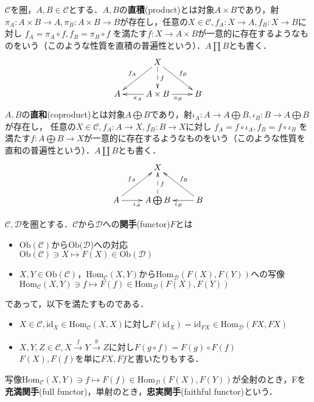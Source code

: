 \begin{defi}
$\mathcal{C}$を圏，$A,B\in \mathcal{C}$とする．$A,B$の{\bf 直積}(product)とは対象$A \times B$であり，射$\pi_A : A \times B \to A , 
\pi_B : A \times B \to B$が存在し，任意の$X \in \mathcal{C}, f_A : X \to A , f_B: X \to B$に対し $f_A = \pi_A \circ f , f_B = \pi_B \circ f$
を満たす$f : X\to A \times B$が一意的に存在するようなものをいう（このような性質を直積の普遍性という）．$A \prod B$とも書く．\\
\[
\xymatrix{
	& \ar[dl]_{f_A} X  \ar@{-->}[d]^{f}  \ar[dr]^{f_B}	& \\
A 	& \ar[l]^{\pi_A} A \times B \ar[r]_{\pi_B} 	& B 
}
\]
$A,B$の{\bf 直和}(coproduct)とは対象$A \bigoplus B$であり，射$\iota_A : A  \to A \bigoplus B, 
\iota_B : B \to  A \bigoplus B$が存在し，
任意の$X \in \mathcal{C}, f_A : A \to X , f_B: B \to X$に対し $f_A = f \circ \iota_A , f_B = f \circ \iota_B$
を満たす$f : A \bigoplus B \to X$が一意的に存在するようなものをいう（このような性質を直和の普遍性という）．$A \coprod B$とも書く．\\
\[
\xymatrix{
	& \ar@{<-}[dl]_{f_A} X  \ar@{<--}[d]^{f}  \ar@{<-}[dr]^{f_B}	& \\
A \ar[r]_{\iota_A}	&  A \bigoplus B  & \ar[l]^{\iota_B} B 
}
\] 
\end{defi} \proofend

\begin{defi}
$\mathcal{C,D}$を圏とする．$\mathcal{C}$から$\mathcal{D}$への{\bf 関手}(functor)$F$とは
\begin{itemize}
\item 
$\mathrm{Ob}(\mathcal{C})$から$\mathrm{Ob}(\mathcal{D}$)への対応\\
 $\mathrm{Ob}(\mathcal{C}) \ni X \mapsto F(X) \in \mathrm{Ob}(\mathcal{D})$
 
 \item 
$X,Y \in \mathrm{Ob}(\mathcal{C})$，$\mathrm{Hom}_\mathcal{C}(X,Y) $から$\mathrm{Hom}_\mathcal{D}(F(X),F(Y))$への写像\\
$\mathrm{Hom}_\mathcal{C}(X,Y) \ni f \mapsto F(f) \in \mathrm{Hom}_\mathcal{D}(F(X),F(Y))$
\end{itemize}
 であって，以下を満たすものである．
 
 \begin{itemize}
 \item
 $X \in \mathcal{C}, \mathrm{id}_X \in \mathrm{Hom}_\mathcal{C}(X,X)$に対し$F(\mathrm{id}_X) = \mathrm{id}_{FX} \in \mathrm{Hom}_\mathcal{D}(FX,FX)$
 \item
 $X,Y,Z \in \mathcal{C}, X \xrightarrow{f} Y \xrightarrow{g} Z$に対し$F(g \circ f) = F(g) \circ F(f)$ \\
 $F(X),F(f)$を単に$FX,Ff$と書いたりもする．
  
 \end{itemize}
 写像$\mathrm{Hom}_\mathcal{C}(X,Y) \ni f \mapsto F(f) \in \mathrm{Hom}_\mathcal{D}(F(X),F(Y))$が全射のとき，Fを{\bf 充満関手}(full functor)，単射のとき，{\bf 忠実関手}(faithful functor)という．
\end{defi} \proofend

